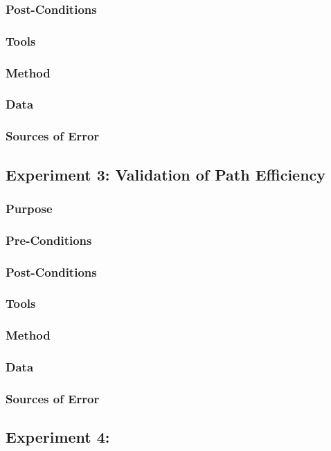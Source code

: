 \documentclass[letterpaper,10pt]{article}
\begin{document}
\subsubsection{Post-Conditions}
\subsubsection{Tools}
\subsubsection{Method}
\subsubsection{Data}
\subsubsection{Sources of Error}

\subsection{Experiment 3: Validation of Path Efficiency}
\subsubsection{Purpose}
\subsubsection{Pre-Conditions}
\subsubsection{Post-Conditions}
\subsubsection{Tools}
\subsubsection{Method}
\subsubsection{Data}
\subsubsection{Sources of Error}

\subsection{Experiment 4: }
\end{document}
